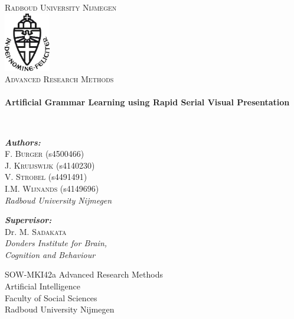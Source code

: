 \begin{titlepage}
\begin{center}

\textsc{\LARGE Radboud University Nijmegen}\\[1cm]

\includegraphics[width=0.15\textwidth]{media/ru-logo}~\\[1cm]

\textsc{\Large Advanced Research Methods}\\[0.6cm]

\HRule \\[0.4cm]
{ \huge \bfseries Artificial Grammar Learning using Rapid Serial Visual Presentation \\[0.4cm] }

\HRule \\[1.2cm]

\begin{flushleft} \large
\emph{\textbf{Authors:}}\\
F. \textsc{Burger} (s4500466)\\
J. \textsc{Kruijswijk} (s4140230)\\
V. \textsc{Strobel} (s4491491)\\
I.M. \textsc{Wijnands} (s4149696)\\
\emph{Radboud University Nijmegen}\\
\end{flushleft}
\begin{flushleft} \large
\emph{\textbf{Supervisor:}} \\
Dr. M. \textsc{Sadakata}\\
\emph{Donders Institute for Brain,\\
Cognition and Behaviour}\\
\end{flushleft}


\vfill

SOW-MKI42a Advanced Research Methods\\
Artificial Intelligence\\
Faculty of Social Sciences\\
Radboud University Nijmegen\\
\vspace{0.2cm}
\date{\large\today} %

\end{center}
\end{titlepage}
